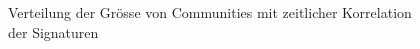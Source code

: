 \begin{figure}[th!]
  \caption{Verteilung der Gr\"osse von Communities mit zeitlicher
    Korrelation der Signaturen}
  \label{fig:time-corrdist}
\end{figure}

